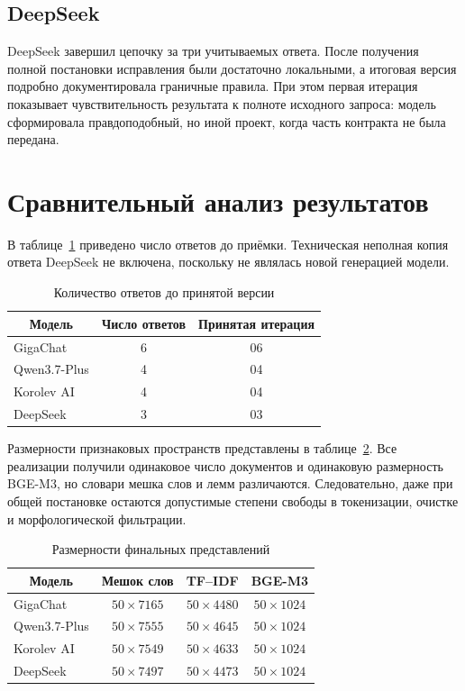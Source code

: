 \documentclass[a4paper,12pt]{extreport}
\begin{document}
\subsection{DeepSeek}

DeepSeek завершил цепочку за три учитываемых ответа. После получения полной постановки исправления были достаточно локальными, а итоговая версия подробно документировала граничные правила. При этом первая итерация показывает чувствительность результата к полноте исходного запроса: модель сформировала правдоподобный, но иной проект, когда часть контракта не была передана.

\section{Сравнительный анализ результатов}

В таблице~\ref{tab:iterations} приведено число ответов до приёмки. Техническая неполная копия ответа DeepSeek не включена, поскольку не являлась новой генерацией модели.

\begin{table}[H]
\raggedright
\caption{Количество ответов до принятой версии}
\label{tab:iterations}
\begin{tabular}{|l|c|c|}
\hline
\multicolumn{1}{|c|}{Модель} & Число ответов & Принятая итерация \\
\hline
GigaChat & 6 & 06 \\
\hline
Qwen3.7-Plus & 4 & 04 \\
\hline
Korolev AI & 4 & 04 \\
\hline
DeepSeek & 3 & 03 \\
\hline
\end{tabular}
\end{table}

Размерности признаковых пространств представлены в таблице~\ref{tab:shapes}. Все реализации получили одинаковое число документов и одинаковую размерность BGE-M3, но словари мешка слов и лемм различаются. Следовательно, даже при общей постановке остаются допустимые степени свободы в токенизации, очистке и морфологической фильтрации.

\begin{table}[H]
\raggedright
\caption{Размерности финальных представлений}
\label{tab:shapes}
\begin{tabular}{|l|c|c|c|}
\hline
\multicolumn{1}{|c|}{Модель} & Мешок слов & TF--IDF & BGE-M3 \\
\hline
GigaChat & $50\times7165$ & $50\times4480$ & $50\times1024$ \\
\hline
Qwen3.7-Plus & $50\times7555$ & $50\times4645$ & $50\times1024$ \\
\hline
Korolev AI & $50\times7549$ & $50\times4633$ & $50\times1024$ \\
\hline
DeepSeek & $50\times7497$ & $50\times4473$ & $50\times1024$ \\
\hline
\end{tabular}
\end{table}
\end{document}
